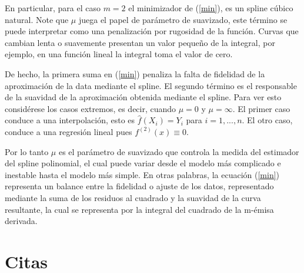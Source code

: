\vspace{0.5cm}

\hspace{0.4cm} En particular, para el caso $m=2$ el minimizador de (\ref{min}), es un spline c\'ubico natural. Note que $\mu$ juega el papel de par\'ametro de suavizado, este t\'ermino se puede interpretar como una penalizaci\'on por rugosidad de la funci\'on. Curvas que cambian lenta o suavemente presentan un valor peque\~no de la integral, por ejemplo, en una funci\'on lineal la integral toma el valor de cero.

\vspace{0.5cm}

\hspace{0.4cm} De hecho, la primera suma en (\ref{min}) penaliza la falta de fidelidad de la aproximaci\'on de la data mediante el spline. El segundo t\'ermino es el responsable de la suavidad de la aproximaci\'on obtenida mediante el spline. Para ver esto consid\'erese los casos extremos, es decir, cuando $\mu =0$ y $\mu=\infty$. El primer caso conduce a una interpolaci\'on, esto es $\hat{f}(X_{i})=Y_{i}$ para $i=1,...,n$. El otro caso, conduce a una regresi\'on lineal pues $f^{(2)}(x)\equiv 0$.

\vspace{0.5cm}

\hspace{0.4cm} Por lo tanto $\mu$ es el par\'ametro de suavizado que controla la medida del estimador del spline polinomial, el cual puede variar desde el modelo m\'as complicado e inestable hasta el modelo m\'as simple. En otras palabras, la ecuaci\'on (\ref{min}) representa un balance entre la fidelidad o ajuste de los datos, representado mediante la suma de los residuos al cuadrado y la suavidad de la curva resultante, la cual se representa por la integral del cuadrado de la m-\'emisa derivada.


\section{Citas}

